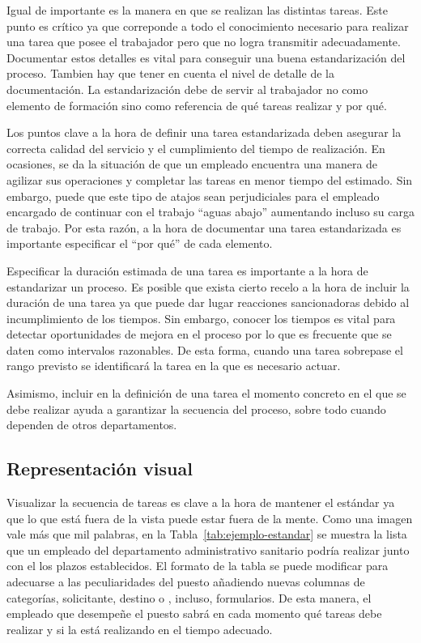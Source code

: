 Igual de importante es la manera en que se realizan las distintas tareas.
Este punto es crítico ya que correponde a todo el conocimiento necesario para realizar una tarea que posee el trabajador pero que no logra transmitir adecuadamente. Documentar estos detalles es vital para conseguir una buena estandarización del proceso.
Tambien hay que tener en cuenta el nivel de detalle de la documentación.
La estandarización debe de servir al trabajador no como elemento de formación sino como referencia de qué tareas realizar y por qué.

Los puntos clave a la hora de definir una tarea estandarizada deben asegurar la correcta calidad del servicio y el cumplimiento del tiempo de realización.
En ocasiones, se da la situación de que un empleado encuentra una manera de agilizar sus operaciones y completar las tareas en menor tiempo del estimado.
Sin embargo, puede que este tipo de atajos sean perjudiciales para el empleado encargado de continuar con el trabajo ``aguas abajo'' aumentando incluso su carga de trabajo. Por esta razón, a la hora de documentar una tarea estandarizada es importante especificar el ``por qué'' de cada elemento.

Especificar la duración estimada de una tarea es importante a la hora de estandarizar un proceso.
Es posible que exista cierto recelo a la hora de incluir la duración de una tarea ya que puede dar lugar reacciones sancionadoras debido al incumplimiento de los tiempos.
Sin embargo, conocer los tiempos es vital para detectar oportunidades de mejora en el proceso por lo que es frecuente que se daten como intervalos razonables.
De esta forma, cuando una tarea sobrepase el rango previsto se identificará la tarea en la que es necesario actuar.

Asimismo, incluir en la definición de una tarea el momento concreto en el que se debe realizar ayuda a garantizar la secuencia del proceso, sobre todo cuando dependen de otros departamentos.

\subsection{Representación visual}

Visualizar la secuencia de tareas es clave a la hora de mantener el estándar ya que lo que está fuera de la vista puede estar fuera de la mente. Como una imagen vale más que mil palabras, en la Tabla~\ref{tab:ejemplo-estandar} se muestra la lista que un empleado del departamento administrativo sanitario podría realizar junto con el los plazos establecidos.
El formato de la tabla se puede modificar para adecuarse a las peculiaridades del puesto añadiendo nuevas columnas de categorías, solicitante, destino o , incluso, formularios.
De esta manera, el empleado que desempeñe el puesto sabrá en cada momento qué tareas debe realizar y si la está realizando en el tiempo adecuado.


